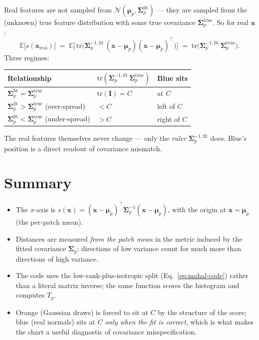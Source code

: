 \documentclass[11pt]{article}
\newcommand{\bmu}{\boldsymbol{\mu}}
\newcommand{\bSigma}{\boldsymbol{\Sigma}}
\newcommand{\E}{\mathbb{E}}
\begin{document}
Real features are not sampled from $\mathcal{N}(\bmu_p, \bSigma_p^{\text{fit}})$
--- they are sampled from the (unknown) true feature distribution with some
true covariance $\bSigma_p^{\text{true}}$. So for real $\mathbf{x}$:
\begin{equation}
  \E\bigl[s(\mathbf{x}_{\text{real}})\bigr]
    \;=\; \E\bigl[\,\mathrm{tr}\bigl(\bSigma_p^{-1,\text{fit}}\,
                (\mathbf{x}-\bmu_p)(\mathbf{x}-\bmu_p)^\top\bigr)\bigr]
    \;=\; \mathrm{tr}\bigl(\bSigma_p^{-1,\text{fit}}\,\bSigma_p^{\text{true}}\bigr).
\end{equation}
Three regimes:
\begin{center}
\begin{tabular}{lll}
\toprule
Relationship & $\mathrm{tr}(\bSigma_p^{-1,\text{fit}}\,\bSigma_p^{\text{true}})$
  & Blue sits \\
\midrule
$\bSigma_p^{\text{fit}} = \bSigma_p^{\text{true}}$
  & $\mathrm{tr}(\mathbf{I}) = C$
  & at $C$ \\
$\bSigma_p^{\text{fit}} > \bSigma_p^{\text{true}}$ (over-spread)
  & $< C$
  & left of $C$ \\
$\bSigma_p^{\text{fit}} < \bSigma_p^{\text{true}}$ (under-spread)
  & $> C$
  & right of $C$ \\
\bottomrule
\end{tabular}
\end{center}
The real features themselves never change --- only the \emph{ruler}
$\bSigma_p^{-1,\text{fit}}$ does. Blue's position is a direct readout of
covariance mismatch.

\section{Summary}

\begin{itemize}[itemsep=2pt]
  \item The $x$-axis is $s(\mathbf{x}) = (\mathbf{x}-\bmu_p)^\top
    \bSigma_p^{-1}(\mathbf{x}-\bmu_p)$, with the origin at $\mathbf{x} = \bmu_p$
    (the per-patch mean).
  \item Distances are measured \emph{from the patch mean} in the metric induced
    by the fitted covariance $\bSigma_p$; directions of low variance count for
    much more than directions of high variance.
  \item The code uses the low-rank-plus-isotropic split (Eq.~\ref{eq:mahal-code})
    rather than a literal matrix inverse; the same function scores the
    histogram and computes $T_p$.
  \item Orange (Gaussian draws) is forced to sit at $C$ by the structure of
    the score; blue (real normals) sits at $C$ \emph{only when the fit is
    correct}, which is what makes the chart a useful diagnostic of covariance
    misspecification.
\end{itemize}
\end{document}
